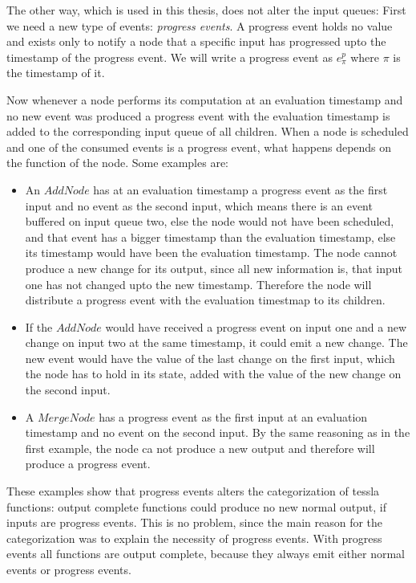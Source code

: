 The other way, which is used in this thesis, does not alter the input queues:
First we need a new type of events: \emph{progress events}.
A progress event holds no value and exists only to notify a node that a specific input has progressed upto the timestamp of the progress event.
We will write a progress event as \(e^p_\pi\) where \(\pi\) is the timestamp of it.

Now whenever a node performs its computation at an evaluation timestamp and no new event was produced a progress event with the evaluation timestamp is added to the corresponding input queue of all children.
When a node is scheduled and one of the consumed events is a progress event, what happens depends on the function of the node. Some examples are:

\begin{itemize}
  \item An \(\mathit{AddNode}\) has at an evaluation timestamp a progress event as the first input and no event as the second input, which means there is an event buffered on input queue two, else the node would not have been scheduled, and that event has a bigger timestamp than the evaluation timestamp, else its timestamp would have been the evaluation timestamp. The node cannot produce a new change for its output, since all new information is, that input one has not changed upto the new timestamp. Therefore the node will distribute a progress event with the evaluation timestmap to its children.
  \item If the \(\mathit{AddNode}\) would have received a progress event on input one and a new change on input two at the same timestamp, it could emit a new change. The new event would have the value of the last change on the first input, which the node has to hold in its state, added with the value of the new change on the second input.
  \item A \(\mathit{MergeNode}\) has a progress event as the first input at an evaluation timestamp and no event on the second input. By the same reasoning as in the first example, the node ca not produce a new output and therefore will produce a progress event.
\end{itemize}

These examples show that progress events alters the categorization of \gls{tessla} functions: output complete functions could produce no new normal output, if inputs are progress events.
This is no problem, since the main reason for the categorization was to explain the necessity of progress events.
With progress events all functions are output complete, because they always emit either normal events or progress events.

